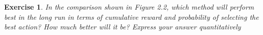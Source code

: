 \documentclass[answers]{exam}
\newtheorem{exercise}[theorem]{Exercise}
\theoremstyle{definition}
\theoremstyle{remark}
\begin{document}
\begin{exercise}
In the comparison shown in Figure 2.2, which method will perform best in the
long run in terms of cumulative reward and probability of selecting the best
action? How much better will it be? Express your answer quantitatively    
\end{exercise}
\end{document}
